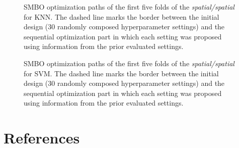 \documentclass[review]{elsarticle}
\begin{document}
\begin{figure} [ht]
	\begin{center}
		\caption[]{SMBO optimization paths of the first five folds of the \emph{spatial/spatial} for \ac{KNN}. The dashed line marks the border between the initial design (30 randomly composed hyperparameter settings) and the sequential optimization part in which each setting was proposed using information from the prior evaluated settings.}
		\label{fig:optimization_paths_knn}
	\end{center}
\end{figure}

\begin{figure} [ht]
	\begin{center}
		\caption[]{SMBO optimization paths of the first five folds of the \emph{spatial/spatial} for \ac{SVM}. The dashed line marks the border between the initial design (30 randomly composed hyperparameter settings) and the sequential optimization part in which each setting was proposed using information from the prior evaluated settings.}
		\label{fig:optimization_paths_svm}
	\end{center}
\end{figure}

\FloatBarrier

\pagebreak

\section*{References}


\end{document}
